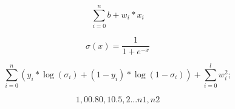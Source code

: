 \documentclass{article}
\begin{document}
\[
\sum_{i=0}^{n} b + w_i*x_i
\]
\pagebreak

\[
\sigma(x) = \frac{1}{1 + e^{-x}}
\]
\pagebreak

\[
\sum_{i=0}^{n} (y_i * \log(\sigma_i) + (1 - y_i) * \log(1 - \sigma_i)) + \sum_{i=0}^{l} w_i ^ 2;
\]
\pagebreak

\[

1,0

0.80,1

0.5,2

...

n1, n2
\]
\pagebreak
\end{document}
